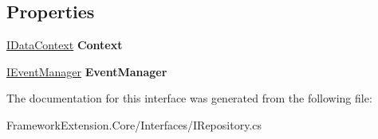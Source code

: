 \subsection*{Properties}
\begin{DoxyCompactItemize}
\item 
\hypertarget{interface_framework_extension_1_1_core_1_1_interfaces_1_1_i_repository_a20857c9d0e76f5a1036622c24c57f46d}{\hyperlink{interface_framework_extension_1_1_core_1_1_interfaces_1_1_i_data_context}{I\-Data\-Context} {\bfseries Context}}\label{interface_framework_extension_1_1_core_1_1_interfaces_1_1_i_repository_a20857c9d0e76f5a1036622c24c57f46d}

\item 
\hypertarget{interface_framework_extension_1_1_core_1_1_interfaces_1_1_i_repository_a93f60b836e59eb79ba13b5384b17bb19}{\hyperlink{interface_framework_extension_1_1_core_1_1_interfaces_1_1_i_event_manager}{I\-Event\-Manager} {\bfseries Event\-Manager}}\label{interface_framework_extension_1_1_core_1_1_interfaces_1_1_i_repository_a93f60b836e59eb79ba13b5384b17bb19}

\end{DoxyCompactItemize}


The documentation for this interface was generated from the following file\-:\begin{DoxyCompactItemize}
\item 
Framework\-Extension.\-Core/\-Interfaces/I\-Repository.\-cs\end{DoxyCompactItemize}
